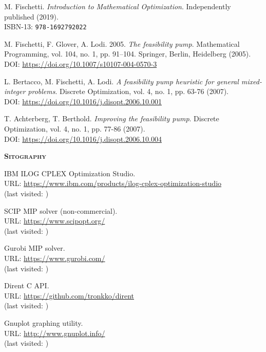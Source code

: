 \documentclass[a4paper,12pt,twoside]{scrbook}
\begin{document}
\begin{thebibliography}{9}
	 M. Fischetti. \textit{Introduction to Mathematical Optimization}. Independently published (2019). \\ ISBN-13: \texttt{978-1692792022}

	 M. Fischetti, F. Glover, A. Lodi. 2005. \textit{The feasibility pump}. Mathematical Programming, vol. 104, no. 1, pp. 91–104. Springer, Berlin, Heidelberg (2005). \\ DOI: \url{https://doi.org/10.1007/s10107-004-0570-3}

	 L. Bertacco, M. Fischetti, A. Lodi. \textit{A feasibility pump heuristic for general mixed-integer problems}. Discrete Optimization, vol. 4, no. 1, pp. 63-76 (2007). \\ DOI: \url{https://doi.org/10.1016/j.disopt.2006.10.001}

	 T. Achterberg, T. Berthold. \textit{Improving the feasibility pump}. Discrete Optimization, vol. 4, no. 1, pp. 77-86 (2007). \\ DOI: \url{https://doi.org/10.1016/j.disopt.2006.10.004}
	
	\vspace{0.5cm}
	\textsc{\Large \textbf{Sitography}}

	 IBM ILOG CPLEX Optimization Studio. \\ URL: \url{https://www.ibm.com/products/ilog-cplex-optimization-studio} \\ (last visited: )

	 SCIP MIP solver (non-commercial). \\ URL: \url{https://www.scipopt.org/} \\ (last visited: )

	 Gurobi MIP solver. \\ URL: \url{https://www.gurobi.com/} \\ (last visited: )

	 Dirent C API. \\ URL: \url{https://github.com/tronkko/dirent} \\ (last visited: )

	 Gnuplot graphing utility. \\ URL: \url{http://www.gnuplot.info/} \\ (last visited: )


\end{thebibliography}
\end{document}
